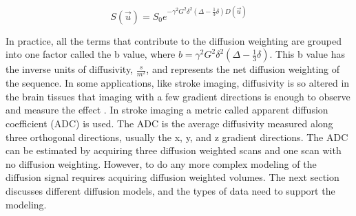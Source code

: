 \begin{equation}
\label{eqn:diffSignal}
S(\vec{u}) = S_0e^{-\gamma^2 G^2 \delta^2(\Delta - \frac{1}{3}\delta) D(\vec{u})}
\end{equation}

In practice, all the terms that contribute to the diffusion weighting are grouped into one factor called the b value, where $b = \gamma^2 G^2 \delta^2(\Delta - \frac{1}{3}\delta)$. This b value has the inverse units of diffusivity, $\frac{s}{m^2}$, and represents the net diffusion weighting of the sequence. In some applications, like stroke imaging, diffusivity is so altered in the brain tissues that imaging with a few gradient directions is enough to observe and measure the effect \cite{Mukherjee_2000}. In stroke imaging a metric called apparent diffusion coefficient (ADC) is used. The ADC is the average diffusivity measured along three orthogonal directions, usually the x, y, and z gradient directions. The ADC can be estimated by acquiring three diffusion weighted scans and one scan with no diffusion weighting. However, to do any more complex modeling of the diffusion signal requires acquiring diffusion weighted volumes. The next section discusses different diffusion models, and the types of data need to support the modeling.
